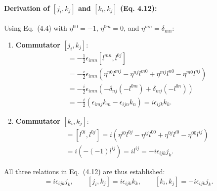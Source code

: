 \documentclass[11pt,a4paper]{article}
\begin{document}
\paragraph{Derivation of $[j_i, k_j]$ and $[k_i, k_j]$ (Eq. 4.12):}
Using Eq.~(4.4) with $\eta^{00} = -1$, $\eta^{0m} = 0$, and $\eta^{mn} = \delta_{mn}$:
\begin{enumerate}
    \item \textbf{Commutator $[j_i, k_j]$}:
    \begin{align}
        [j_i, k_j] &= -\frac{1}{2}\epsilon_{imn}[l^{mn}, l^{0j}] \nonumber \\
        &= -\frac{i}{2}\epsilon_{imn}\left(\eta^{n0}l^{mj} - \eta^{nj}l^{m0} + \eta^{mj}l^{n0} - \eta^{m0}l^{nj}\right) \nonumber \\
        &= -\frac{i}{2}\epsilon_{imn}\left(-\delta_{nj}(-l^{0m}) + \delta_{mj}(-l^{0n})\right) \nonumber \\
        &= -\frac{i}{2}\left(\epsilon_{imj}k_m - \epsilon_{ijn}k_n\right) = i\epsilon_{ijk}k_k.
    \end{align}
    \item \textbf{Commutator $[k_i, k_j]$}:
    \begin{align}
        [k_i, k_j] &= [l^{0i}, l^{0j}] = i\left(\eta^{i0}l^{0j} - \eta^{ij}l^{00} + \eta^{0j}l^{i0} - \eta^{00}l^{ij}\right) \nonumber \\
        &= i\left(-(-1)l^{ij}\right) = i l^{ij} = -i\epsilon_{ijk}j_k.
    \end{align}
\end{enumerate}
All three relations in Eq.~(4.12) are thus established:
\begin{equation}
    [j_i, j_j] = i\epsilon_{ijk}j_k, \qquad [j_i, k_j] = i\epsilon_{ijk}k_k, \qquad [k_i, k_j] = -i\epsilon_{ijk}j_k.
\end{equation}
\end{document}
